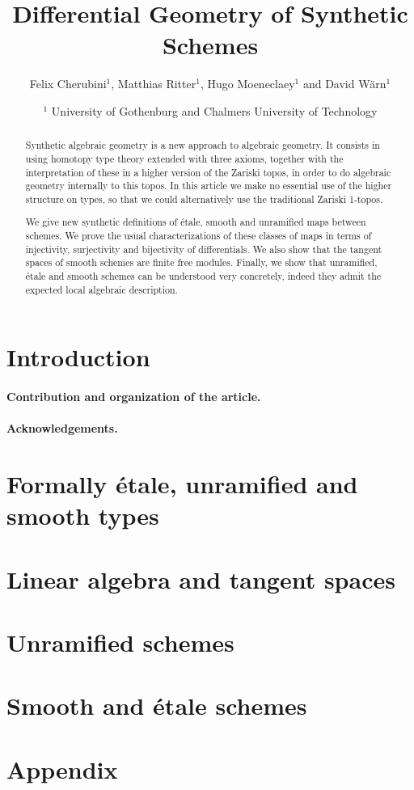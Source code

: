 \documentclass{../util/zariski}
\title{Differential Geometry of Synthetic Schemes}
\author{Felix Cherubini$^1$, Matthias Ritter$^1$, Hugo Moeneclaey$^1$ and David Wärn$^1$}
\date{$^1$ University of Gothenburg and Chalmers University of Technology }
\begin{document}
\maketitle

\begin{abstract}
  Synthetic algebraic geometry is a new approach to algebraic geometry. It consists in using homotopy type theory extended with three axioms, together with the interpretation of these in a higher version of the Zariski topos, in order to do algebraic geometry internally to this topos. In this article we make no essential use of the higher structure on types, so that we could alternatively use the traditional Zariski 1-topos.
  
  We give new synthetic definitions of étale, smooth and unramified maps between schemes.
  We prove the usual characterizations of these classes of maps in terms of injectivity, surjectivity and bijectivity of differentials. We also show that the tangent spaces of smooth schemes are finite free modules.
  Finally, we show that unramified, étale and smooth schemes can be understood very concretely, indeed they admit the expected local algebraic description.
\end{abstract}

\tableofcontents

\section*{Introduction}

\paragraph{Contribution and organization of the article. }

\paragraph{Acknowledgements.}


\section{Formally étale, unramified and smooth types}


\section{Linear algebra and tangent spaces}


\section{Unramified schemes}


\section{Smooth and étale schemes}


\pagebreak
\appendix
\section{Appendix}


\printindex

\printbibliography
\end{document}
